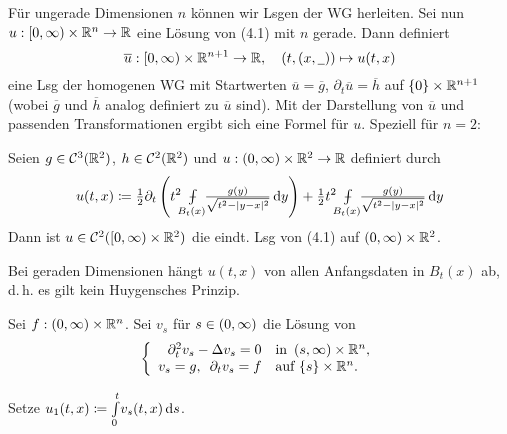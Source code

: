 \documentclass{cheat-sheet}
\def\Xint#1{\mathchoice
   {\XXint\displaystyle\textstyle{#1}}%
   {\XXint\textstyle\scriptstyle{#1}}%
   {\XXint\scriptstyle\scriptscriptstyle{#1}}%
   {\XXint\scriptscriptstyle\scriptscriptstyle{#1}}%
   \!\int}
\def\XXint#1#2#3{{\setbox0=\hbox{$#1{#2#3}{\int}$}
     \vcenter{\hbox{$#2#3$}}\kern-.5\wd0}}
\def\dashint{\Xint-}
\newcommand{\mymvint}[2]{{\textstyle \dashint\limits_{#1}^{#2}}}
\newcommand{\MVInt}[4]{\mymvint{#1}{#2} #3 \,\d #4}
\begin{document}

\begin{bem}
  Für ungerade Dimensionen $n$ können wir Lsgen der WG herleiten. Sei nun $u : \left[ 0, \infty \right) \times \mathbb{R}^n \to \mathbb{R}$ eine Lösung von (4.1) mit $n$ gerade. Dann definiert
  \[
    \overline{u} : \left[ 0, \infty \right) \times \mathbb{R}^{n+1} \to \mathbb{R}, \quad (t, (x, \underline{\,\,\,})) \mapsto u(t, x)
  \]
  eine Lsg der homogenen WG mit Startwerten $\overline{u} = \overline{g}$, $\partial_t \overline{u} = \overline{h}$ auf $\{ 0 \} \times \mathbb{R}^{n+1}$ (wobei $\overline{g}$ und $\overline{h}$ analog definiert zu $\overline{u}$ sind). Mit der Darstellung von $\overline{u}$ und passenden Transformationen ergibt sich eine Formel für $u$. Speziell für $n=2$:
\end{bem}

\begin{satz}
  Seien $g \in \mathcal{C}^3(\mathbb{R}^2)$, $h \in \mathcal{C}^2(\mathbb{R}^2)$ und $u : \left( 0, \infty \right) \times \mathbb{R}^2 \to \mathbb{R}$ definiert durch
  \[
    u(t, x) \coloneqq \tfrac{1}{2} \partial_t \left( t^2 \enspace \MVInt{\mathclap{B_t(x)}}{}{\enspace \tfrac{g(y)}{\sqrt{t^2 - \abs{y-x}^2}}}{y} \right) + \tfrac{1}{2} t^2 \enspace \MVInt{\mathclap{B_t(x)}}{}{\enspace \tfrac{g(y)}{\sqrt{t^2 - \abs{y-x}^2}}}{y}
  \]
  Dann ist $u \in \mathcal{C}^2(\left[ 0, \infty \right) \times \mathbb{R}^2)$ die eindt. Lsg von (4.1) auf $\left( 0, \infty \right) \times \mathbb{R}^2$.
\end{satz}

\begin{bem}
  Bei geraden Dimensionen hängt $u(t, x)$ von allen Anfangsdaten in $B_t(x)$ ab, d.\,h. es gilt kein Huygensches Prinzip.
\end{bem}



Sei $f : \left( 0, \infty \right) \times \mathbb{R}^n$. Sei $v_s$ für $s \in \left( 0, \infty \right)$ die Lösung von
\[
  \left\{ \begin{array}{rlll}
    \partial_t^2 v_s - \Delta v_s = 0 & \text{in } \left( s, \infty \right) \times \mathbb{R}^n, \\
    v_s = g, \enspace \partial_t v_s = f & \text{auf } \{ s \} \times \mathbb{R}^n.
  \end{array} \right.
\]

Setze $u_1(t, x) \coloneqq {\textstyle \int\limits_{0}^{t}} v_s(t, x) \,\mathrm{d} s$.
\end{document}
